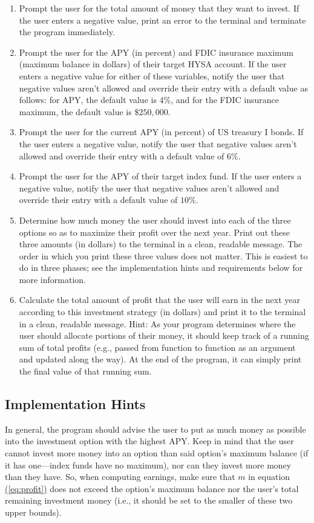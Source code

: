 \documentclass{article}
\newcommand{\refeq}[1]{\hyperref[eq:#1]{(\ref{eq:#1})}}
\begin{document}
\begin{enumerate}
    \item Prompt the user for the total amount of money that they want to invest. If the user enters a negative value, print an error to the terminal and terminate the program immediately.
    \item Prompt the user for the APY (in percent) and FDIC insurance maximum (maximum balance in dollars) of their target HYSA account. If the user enters a negative value for either of these variables, notify the user that negative values aren't allowed and override their entry with a default value as follows: for APY, the default value is $4\%$, and for the FDIC insurance maximum, the default value is $\$250{,}000$.
    \item Prompt the user for the current APY (in percent) of US treasury I bonds. If the user enters a negative value, notify the user that negative values aren't allowed and override their entry with a default value of $6\%$.
    \item Prompt the user for the APY of their target index fund. If the user enters a negative value, notify the user that negative values aren't allowed and override their entry with a default value of $10\%$.
    \item Determine how much money the user should invest into each of the three options so as to maximize their profit over the next year. Print out these three amounts (in dollars) to the terminal in a clean, readable message. The order in which you print these three values does not matter. This is easiest to do in three phases; see the implementation hints and requirements below for more information.
    \item Calculate the total amount of profit that the user will earn in the next year according to this investment strategy (in dollars) and print it to the terminal in a clean, readable message. Hint: As your program determines where the user should allocate portions of their money, it should keep track of a running sum of total profits (e.g., passed from function to function as an argument and updated along the way). At the end of the program, it can simply print the final value of that running sum.
\end{enumerate}

\subsection{Implementation Hints}

In general, the program should advise the user to put as much money as possible into the investment option with the highest APY. Keep in mind that the user cannot invest more money into an option than said option's maximum balance (if it has one---index funds have no maximum), nor can they invest more money than they have. So, when computing earnings, make sure that $m$ in equation \refeq{profit} does not exceed the option's maximum balance nor the user's total remaining investment money (i.e., it should be set to the smaller of these two upper bounds).
\end{document}
